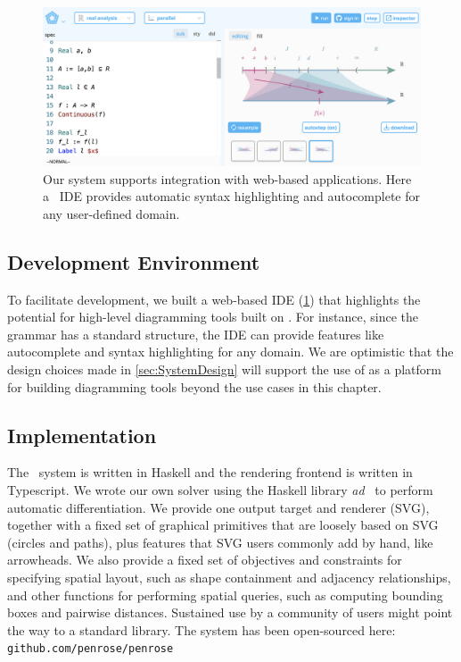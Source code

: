 \begin{figure}[t]
   \includegraphics[width=\columnwidth]{assets/penrose/PenroseIDE.jpg}
   \caption{Our system supports integration with web-based applications. Here a \Penrose\ IDE provides automatic syntax highlighting and autocomplete for any user-defined domain.\label{fig:PenroseIDE}}
\end{figure}

\subsection{Development Environment}
\label{sec:DevelopmentEnvironment}

To facilitate development, we built a web-based IDE (\cref{fig:PenroseIDE}) that highlights the potential for high-level diagramming tools built on \Penrose{}. For instance, since the \Domain{} grammar has a standard structure, the IDE can provide features like autocomplete and syntax highlighting for any domain. We are optimistic that the design choices made in \cref{sec:SystemDesign} will support the use of \Penrose{} as a platform for building diagramming tools beyond the use cases in this chapter.


\subsection{Implementation}
\label{sec:Implementation}

The \Penrose\ system is written in Haskell and the rendering frontend is written in Typescript. We wrote our own solver using the Haskell library \textit{ad}~\cite{autodiff:kmett} to perform automatic differentiation. We provide one output target and renderer (SVG), together with a fixed set of graphical primitives that are loosely based on SVG (\eg circles and paths), plus features that SVG users commonly add by hand, like arrowheads. We also provide a fixed set of objectives and constraints for specifying spatial layout, such as shape containment and adjacency relationships, and other functions for performing spatial queries, such as computing bounding boxes and pairwise distances. Sustained use by a community of users might point the way to a standard library. The system has been open-sourced here: \texttt{github.com/penrose/penrose}


